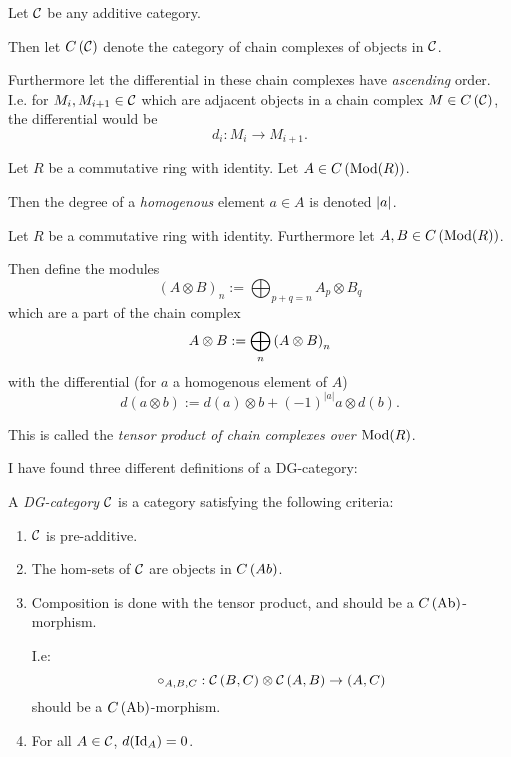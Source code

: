 \begin{notation}
    Let \( {\mathcal{C}} \) be any additive category.
    
    Then let \( C \left( {\mathcal{C}} \right) \) denote the category of chain complexes of objects in \( {\mathcal{C}} \).

    Furthermore let the differential in these chain complexes have \emph{ascending} order. I.e. for \( M_i, M_{i+1} \in {\mathcal{C}} \) which are adjacent objects in a chain complex \( M \in C \left( {\mathcal{C}} \right) \), the differential would be
    \[
        d_i : M_i \to M_{i + 1}.
    \]
\end{notation}

\begin{notation}
    Let \( R \) be a commutative ring with identity. Let \( A \in C \left( \operatorname{Mod}(R) \right) \).

    Then the degree of a \emph{homogenous} element \( a \in A \) is denoted \emph{\( \lvert a \rvert \)}.
\end{notation}

\begin{definition}
    \label{def:massey_product_in_dg_cat/what_is_a_dg_cat/tensor_product_of_chain_complexes}
    Let \( R \) be a commutative ring with identity. Furthermore let \( A, B \in C \left( \operatorname{Mod}(R) \right) \).

    Then define the modules
    \[
        (A \otimes B)_n := \bigoplus_{p + q = n} A_p \otimes B_q
    \]
    which are a part of the chain complex
    \[
        A \otimes B := \bigoplus_n \left( A \otimes B \right)_n
    \]
    with the differential (for \( a \) a homogenous element of \( A \))
    \[
        d(a \otimes b) := d(a) \otimes b + (-1)^{|a|} a \otimes d(b).
    \]

    This is called the \emph{tensor product of chain complexes over \( \operatorname{Mod}(R) \)}.
\end{definition}

I have found three different definitions of a DG-category:

\begin{definition}
    \label{def:massey_product_in_dg_cat/what_is_a_dg_cat/dg_cat_bondal--kapranov_1991}
    A \emph{DG-category} \( {\mathcal{C}} \) is a category satisfying the following criteria:
    \begin{enumerate}
        \item \( {\mathcal{C}} \) is pre-additive.
        \item The hom-sets of \( {\mathcal{C}} \) are objects in \( C \left( Ab \right) \).
        \item{
            Composition is done with the tensor product, and should be a \( C \left( \operatorname{Ab} \right) \)-morphism.

            I.e:
            \[
                \circ_{A,B,C}: {\mathcal{C}} \left( B, C \right) \otimes {\mathcal{C}} \left( A, B \right) \to \left( A, C \right)
            \]
            should be a \( C \left( \operatorname{Ab} \right) \)-morphism.
        }
        \item For all \( A \in {\mathcal{C}} \), \( d(\operatorname{Id}_A) = 0 \).
    \end{enumerate}
\end{definition}

